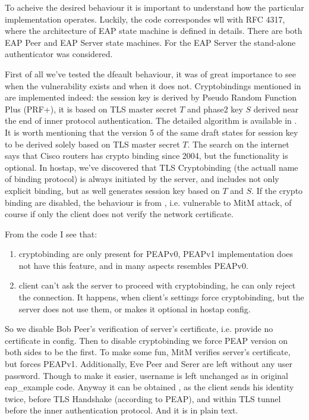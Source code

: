 \documentclass{amsart}
\begin{document}
To acheive the desired behaviour it is important to understand
how the particular implementation operates. Luckily,
the code correspondes wll with RFC 4317, where the architecture of EAP state
machine is defined in details.
There are both EAP Peer and EAP Server state machines.
For the EAP Server the stand-alone authenticator was considered.

First of all we've tested the dfeault behaviour,
it was of great importance to see when the vulnerability exists and when
it does not.
Cryptobindings mentioned in \cite{tap2002} are implemented indeed:
the session key is derived by Pseudo Random Function Plus (PRF+),
it is based on TLS master secret $T$ and phase2 key $S$
derived near the end of inner protocol authentication.
The detailed algorithm is available in \cite{josefsson-draft-10}.
It is worth mentioning that the version 5 \cite{josefsson-draft-05}
of the same draft
states for session key to be derived solely based on TLS master secret $T$.
The search on the internet says that Cisco routers has crypto binding since 2004,
but the functionality is optional.
In hostap, we've discovered that TLS Cryptobinding
(the actuall name of binding protocol)
is always initiated by the server,
and includes not only explicit binding,
but as well generates session key based on $T$ and $S$.
If the crypto binding are disabled,
the behaviour is from \cite{josefsson-draft-05},
i.e. vulnerable to MitM attack,
of course if only the client does not verify the network certificate.

From the code I see that:
\begin{enumerate}
  \item cryptobinding are only present for PEAPv0,
    PEAPv1 implementation does not have this feature,
    and in many aspects resembles PEAPv0.
  \item client can't ask the server to proceed with cryptobinding,
    he can only reject the connection.
    It happens, when client's settings force
    cryptobinding, but the server does not use them, or makes it optional
    in hostap config.
\end{enumerate}

So we disable Bob Peer's verification of server's certificate,
i.e. provide no certificate in config.
Then to disable cryptobinding we force PEAP version on both sides
to be the first. To make some fun,
MitM verifies server's certificate, but forces PEAPv1.
Additionally, Eve Peer and Serer are left without any user password.
Though to make it easier, username is left unchanged
as in original eap\_example code.
Anyway it can be obtained , as the client sends his identity twice,
before TLS Handshake (according to PEAP),
and within TLS tunnel before the inner authentication protocol.
And it is in plain text.
\end{document}
